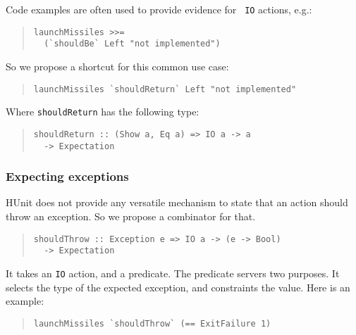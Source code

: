 \documentclass[preprint]{sigplanconf}
\begin{document}
\noindent Code examples are often used to provide evidence for {\tt
IO} actions, e.g.:

\begin{quote}
\small
\begin{verbatim}
launchMissiles >>=
  (`shouldBe` Left "not implemented")
\end{verbatim}
\end{quote}

\noindent So we propose a shortcut for this common use case:

\begin{quote}
\small
\begin{verbatim}
launchMissiles `shouldReturn` Left "not implemented"
\end{verbatim}
\end{quote}

\noindent Where \verb|shouldReturn| has the following type:

\begin{quote}
\small
\begin{verbatim}
shouldReturn :: (Show a, Eq a) => IO a -> a
  -> Expectation
\end{verbatim}
\end{quote}


\subsubsection{Expecting exceptions}
\label{sec:expacting-exceptions}

HUnit does not provide any versatile mechanism to state that an action
should throw an exception.  So we propose a combinator for that.

\begin{quote}
\small
\begin{verbatim}
shouldThrow :: Exception e => IO a -> (e -> Bool)
  -> Expectation
\end{verbatim}
\end{quote}

\noindent It takes an {\tt IO} action, and a predicate.  The predicate
servers two purposes.  It selects the type of the expected exception,
and constraints the value.  Here is an example:

\begin{quote}
\small
\begin{verbatim}
launchMissiles `shouldThrow` (== ExitFailure 1)
\end{verbatim}
\end{quote}
\end{document}
